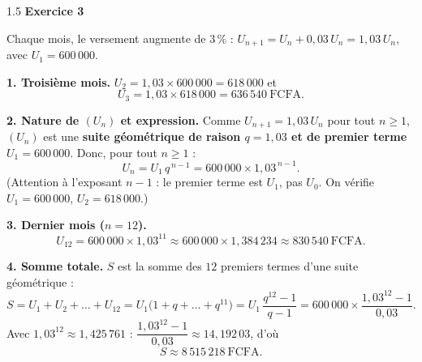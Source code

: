 \documentclass[12pt]{article}
\begin{document}
\begin{spacing}{1.5}
\medskip\textbf{Exercice 3}

Chaque mois, le versement augmente de $3\,\%$ : $U_{n+1}=U_n+0{,}03\,U_n=1{,}03\,U_n$, avec $U_1=600\,000$.

\textbf{1. Troisième mois.} $U_2=1{,}03\times600\,000=618\,000$ et
\[
U_3=1{,}03\times618\,000=\boxed{636\,540\ \text{FCFA}}.
\]

\textbf{2. Nature de $(U_n)$ et expression.} Comme $U_{n+1}=1{,}03\,U_n$ pour tout $n\ge1$, $(U_n)$ est une \textbf{suite géométrique de raison $q=1{,}03$ et de premier terme $U_1=600\,000$}. Donc, pour tout $n\ge1$ :
\[
\boxed{U_n=U_1\,q^{\,n-1}=600\,000\times1{,}03^{\,n-1}}.
\]
(Attention à l'exposant $n-1$ : le premier terme est $U_1$, pas $U_0$. On vérifie $U_1=600\,000$, $U_2=618\,000$.)

\textbf{3. Dernier mois ($n=12$).}
\[
U_{12}=600\,000\times1{,}03^{11}\approx600\,000\times1{,}384\,234\approx\boxed{830\,540\ \text{FCFA}}.
\]

\textbf{4. Somme totale.} $S$ est la somme des $12$ premiers termes d'une suite géométrique :
\[
S=U_1+U_2+\dots+U_{12}=U_1\big(1+q+\dots+q^{11}\big)=U_1\,\frac{q^{12}-1}{q-1}=600\,000\times\frac{1{,}03^{12}-1}{0{,}03}.
\]
Avec $1{,}03^{12}\approx1{,}425\,761$ : $\dfrac{1{,}03^{12}-1}{0{,}03}\approx14{,}192\,03$, d'où
\[
\boxed{S\approx8\,515\,218\ \text{FCFA}}.
\]

\end{spacing}
\end{document}
